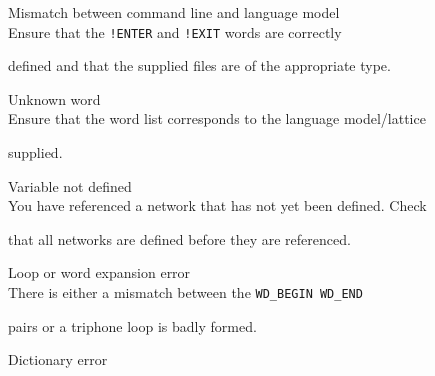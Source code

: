 \begin{itemize}
\begin{itemize}
\end{itemize}










\begin{itemize}


 Mismatch between command line and language model\\


        Ensure that the \texttt{!ENTER} and \texttt{!EXIT} words are correctly 


        defined and that the supplied files are of the appropriate type.





 Unknown word\\


        Ensure that the word list corresponds to the language model/lattice


        supplied.





\end{itemize}










\begin{itemize}


 Variable not defined\\


        You have referenced a network that has not yet been defined.  Check 


        that all networks are defined before they are referenced.





 Loop or word expansion error\\


        There is either a mismatch between the \texttt{WD\_BEGIN WD\_END} 


        pairs or a triphone loop is badly formed.





 Dictionary error\\



\end{itemize}
\end{itemize}
